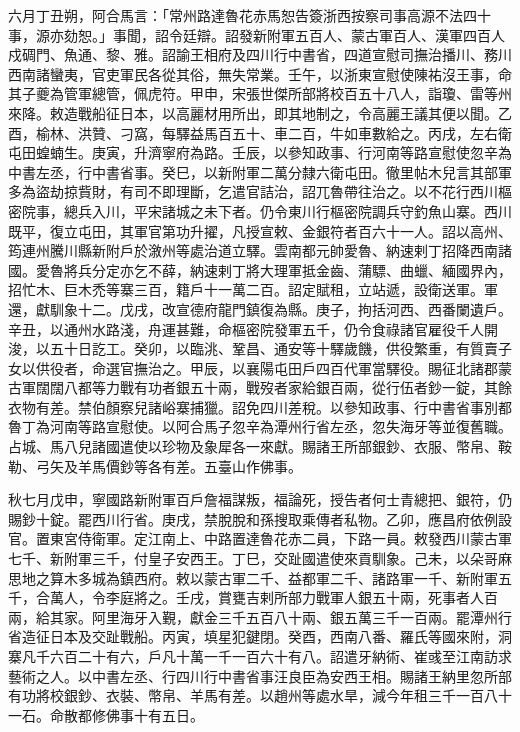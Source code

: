 \begin{pinyinscope}
 六月丁丑朔，阿合馬言：「常州路達魯花赤馬恕告簽浙西按察司事高源不法四十事，源亦劾恕。」事聞，詔令廷辯。詔發新附軍五百人、蒙古軍百人、漢軍四百人戍碉門、魚通、黎、雅。詔諭王相府及四川行中書省，四道宣慰司撫治播川、務川西南諸蠻夷，官吏軍民各從其俗，無失常業。壬午，以浙東宣慰使陳祐沒王事，命其子夔為管軍總管，佩虎符。甲申，宋張世傑所部將校百五十八人，詣瓊、雷等州來降。敕造戰船征日本，以高麗材用所出，即其地制之，令高麗王議其便以聞。乙酉，榆林、洪贊、刁窩，每驛益馬百五十、車二百，牛如車數給之。丙戌，左右衛屯田蝗蝻生。庚寅，升濟寧府為路。壬辰，以參知政事、行河南等路宣慰使忽辛為中書左丞，行中書省事。癸巳，以新附軍二萬分隸六衛屯田。徹里帖木兒言其部軍多為盜劫掠貲財，有司不即理斷，乞遣官詰治，詔兀魯帶往治之。以不花行西川樞密院事，總兵入川，平宋諸城之未下者。仍令東川行樞密院調兵守釣魚山寨。西川既平，復立屯田，其軍官第功升擢，凡授宣敕、金銀符者百六十一人。詔以高州、筠連州騰川縣新附戶於漵州等處治道立驛。雲南都元帥愛魯、納速剌丁招降西南諸國。愛魯將兵分定亦乞不薛，納速剌丁將大理軍抵金齒、蒲驃、曲蠟、緬國界內，招忙木、巨木禿等寨三百，籍戶十一萬二百。詔定賦租，立站遞，設衛送軍。軍還，獻馴象十二。戊戌，改宣德府龍門鎮復為縣。庚子，拘括河西、西番闌遺戶。辛丑，以通州水路淺，舟運甚難，命樞密院發軍五千，仍令食祿諸官雇役千人開浚，以五十日訖工。癸卯，以臨洮、鞏昌、通安等十驛歲饑，供役繁重，有質賣子女以供役者，命選官撫治之。甲辰，以襄陽屯田戶四百代軍當驛役。賜征北諸郡蒙古軍闊闊八都等力戰有功者銀五十兩，戰歿者家給銀百兩，從行伍者鈔一錠，其餘衣物有差。禁伯顏察兒諸峪寨捕獵。詔免四川差稅。以參知政事、行中書省事別都魯丁為河南等路宣慰使。以阿合馬子忽辛為潭州行省左丞，忽失海牙等並復舊職。占城、馬八兒諸國遣使以珍物及象犀各一來獻。賜諸王所部銀鈔、衣服、幣帛、鞍勒、弓矢及羊馬價鈔等各有差。五臺山作佛事。



 秋七月戊申，寧國路新附軍百戶詹福謀叛，福論死，授告者何士青總把、銀符，仍賜鈔十錠。罷西川行省。庚戌，禁脫脫和孫搜取乘傳者私物。乙卯，應昌府依例設官。置東宮侍衛軍。定江南上、中路置達魯花赤二員，下路一員。敕發西川蒙古軍七千、新附軍三千，付皇子安西王。丁巳，交趾國遣使來貢馴象。己未，以朵哥麻思地之算木多城為鎮西府。敕以蒙古軍二千、益都軍二千、諸路軍一千、新附軍五千，合萬人，令李庭將之。壬戌，賞甕吉剌所部力戰軍人銀五十兩，死事者人百兩，給其家。阿里海牙入覲，獻金三千五百八十兩、銀五萬三千一百兩。罷潭州行省造征日本及交趾戰船。丙寅，填星犯鍵閉。癸酉，西南八番、羅氏等國來附，洞寨凡千六百二十有六，戶凡十萬一千一百六十有八。詔遣牙納術、崔彧至江南訪求藝術之人。以中書左丞、行四川行中書省事汪良臣為安西王相。賜諸王納里忽所部有功將校銀鈔、衣裝、幣帛、羊馬有差。以趙州等處水旱，減今年租三千一百八十一石。命散都修佛事十有五日。




\end{pinyinscope}
